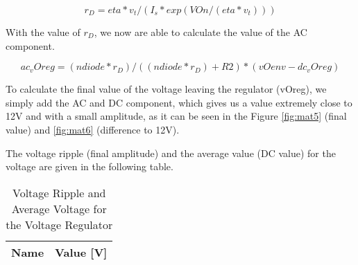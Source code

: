 \begin{equation}
r_D = eta*v_t/(I_s*exp(VOn/(eta*v_t)))
\label{eq:1.6}
\end{equation}

With the value of $r_D$, we now are able to calculate the value of the AC component.

\begin{equation}
ac_vOreg = (ndiode*r_D)/((ndiode*r_D)+R2)*(vOenv-dc_vOreg)
\label{eq:1.7}
\end{equation}

To calculate the final value of the voltage leaving the regulator (vOreg), we simply add the AC and DC component, which gives us a value extremely close to 12V and with a small amplitude, as it can be seen in the Figure \ref{fig:mat5} (final value) and \ref{fig:mat6} (difference to 12V).



The voltage ripple (final amplitude) and the average value (DC value) for the voltage are given in the following table.

\begin{table}[H]
  \centering
  \begin{tabular}{|l|r|}
    \hline    
    {\bf Name} & {\bf Value [V]} \\ \hline
    
  \end{tabular}
  \caption{Voltage Ripple and Average Voltage for the Voltage Regulator}
  \label{tab:mat7}
\end{table}



